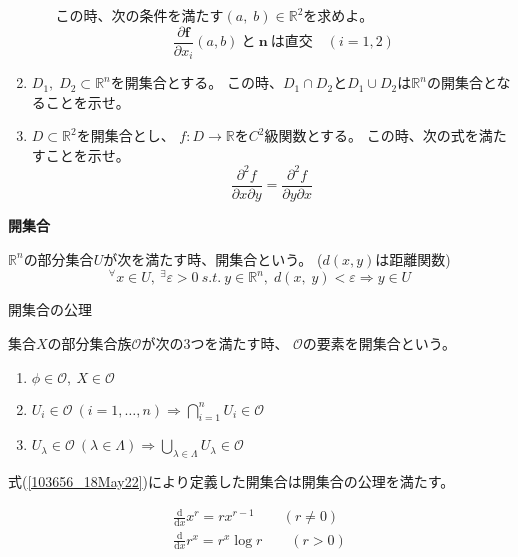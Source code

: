 \documentclass[12pt,b5paper]{ltjsarticle}
\begin{document}
\begin{enumerate}
\begin{enumerate}
             この時、次の条件を満たす$(a,\;b)\in\mathbb{R}^2$を求めよ。
             \begin{equation}
              \frac{\partial \bm{f}}{\partial x_i}(a,b)
               \ と\ \bm{n} \ は直交 \quad (i=1,2)
             \end{equation}
       \end{enumerate}
 \item
      $D_1,\;D_2\subset \mathbb{R}^n$を開集合とする。
      この時、$D_1\cap D_2$と$D_1\cup D_2$は$\mathbb{R}^n$の開集合となることを示せ。
 \item
      $D\subset \mathbb{R}^2$を開集合とし、
      $f:D\rightarrow \mathbb{R}$を$C^2$級関数とする。
      この時、次の式を満たすことを示せ。
      \begin{equation}
       \frac{\partial^2 f}{\partial x\partial y}
        =\frac{\partial^2 f}{\partial y\partial x}
      \end{equation}
\end{enumerate}

\hrulefill

\textbf{開集合}

$\mathbb{R}^n$の部分集合$U$が次を満たす時、開集合という。
($d(x,y)$は距離関数)
\begin{equation}
 {}^{\forall} x\in U, \ {}^{\exists}\varepsilon >0\
  s.t.\ y\in\mathbb{R}^n,\; d(x,\;y)<\varepsilon \Rightarrow y\in U\label{103656_18May22}
\end{equation}

開集合の公理

集合$X$の部分集合族$\mathcal{O}$が次の3つを満たす時、
$\mathcal{O}$の要素を開集合という。
\begin{enumerate}
 \item $\phi\in\mathcal{O}, \ X\in\mathcal{O}$
 \item $\displaystyle U_i\in\mathcal{O}\ (i=1,\dots,n) \Rightarrow \bigcap_{i=1}^{n}U_i\in\mathcal{O}$
 \item $\displaystyle U_{\lambda}\in\mathcal{O}\ (\lambda\in\Lambda) \Rightarrow \bigcup_{\lambda\in\Lambda}U_{\lambda}\in\mathcal{O}$
\end{enumerate}


式(\ref{103656_18May22})により定義した開集合は開集合の公理を満たす。

\dotfill


\begin{align}
 \frac{\mathrm{d}}{\mathrm{d}x}x^r = rx^{r-1} \qquad (r\ne 0)\\
 \frac{\mathrm{d}}{\mathrm{d}x}r^x = r^x \log r \qquad (r> 0)
\end{align}
\end{document}
